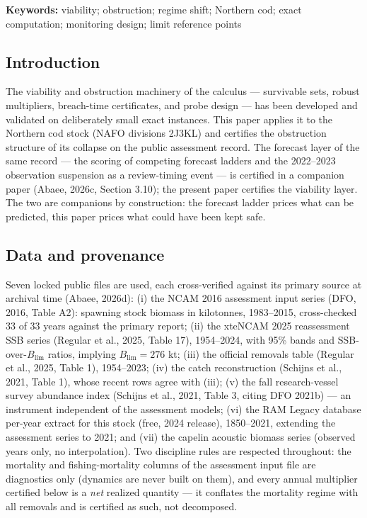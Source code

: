 \documentclass[10pt,twocolumn]{article}
\theoremstyle{plain}
\theoremstyle{remark}
\begin{document}
\textbf{Keywords:} viability; obstruction; regime shift; Northern cod;
exact computation; monitoring design; limit reference points

\subsection{Introduction}\label{intro}

The viability and obstruction machinery of the calculus --- survivable
sets, robust multipliers, breach-time certificates, and probe design ---
has been developed and validated on deliberately small exact instances. This paper applies it to the Northern cod stock (NAFO
divisions 2J3KL) and certifies the obstruction structure of its
collapse on the public assessment record. The forecast layer of the
same record --- the scoring of competing forecast ladders and the
2022--2023 observation suspension as a review-timing event --- is
certified in a companion paper (Abaee, 2026c, Section 3.10); the
present paper certifies the viability layer. The two are companions by
construction: the forecast ladder prices what can be predicted, this
paper prices what could have been kept safe.

\subsection{Data and provenance}\label{data}

Seven locked public files are used, each cross-verified against its
primary source at archival time (Abaee, 2026d): (i) the NCAM 2016
assessment input series (DFO, 2016, Table A2): spawning stock biomass
in kilotonnes, 1983--2015, cross-checked 33 of 33 years against the
primary report; (ii) the xteNCAM 2025 reassessment SSB series (Regular
et al., 2025, Table 17), 1954--2024, with 95\% bands and
SSB-over-\(B_{\mathrm{lim}}\) ratios, implying \(B_{\mathrm{lim}} = 276\)
kt; (iii) the official removals table (Regular et al., 2025, Table 1),
1954--2023; (iv) the catch reconstruction (Schijns et al., 2021, Table
1), whose recent rows agree with (iii); (v) the fall research-vessel
survey abundance index (Schijns et al., 2021, Table 3, citing DFO
2021b) --- an instrument independent of the assessment models; (vi) the
RAM Legacy database per-year extract for this stock (free, 2024
release), 1850--2021, extending the assessment series to 2021; and
(vii) the capelin acoustic biomass series (observed years only, no
interpolation). Two discipline rules are respected throughout: the
mortality and fishing-mortality columns of the assessment input file
are diagnostics only (dynamics are never built on them), and every
annual multiplier certified below is a \emph{net} realized quantity ---
it conflates the mortality regime with all removals and is certified as
such, not decomposed.
\end{document}
